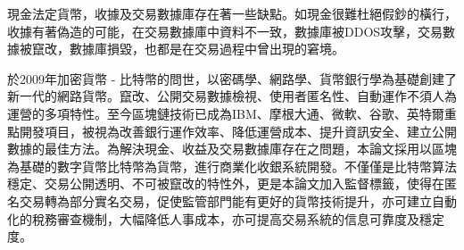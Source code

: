 

現金法定貨幣，收據及交易數據庫存在著一些缺點。如現金很難杜絕假鈔的橫行，收據有著偽造的可能，在交易數據庫中資料不一致，數據庫被DDOS攻擊，交易數據被竄改，數據庫損毀，也都是在交易過程中曾出現的窘境。

於2009年加密貨幣 - 比特幣的問世，以密碼學、網路學、貨幣銀行學為基礎創建了新一代的網路貨幣。竄改、公開交易數據檢視、使用者匿名性、自動運作不須人為運營的多項特性。至今區塊鏈技術已成為IBM、摩根大通、微軟、谷歌、英特爾重點開發項目，被視為改善銀行運作效率、降低運營成本、提升資訊安全、建立公開數據的最佳方法。為解決現金、收益及交易數據庫存在之問題，本論文採用以區塊為基礎的數字貨幣比特幣為貨幣，進行商業化收銀系統開發。不僅僅是比特幣算法穩定、交易公開透明、不可被竄改的特性外，更是本論文加入監督標籤，使得在匿名交易轉為部分實名交易，促使監管部門能有更好的貨幣技術提升，亦可建立自動化的稅務審查機制，大幅降低人事成本，亦可提高交易系統的信息可靠度及穩定度。
